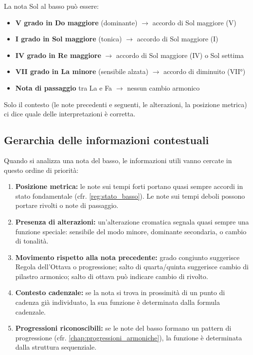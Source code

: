 \begin{esempio}
	\label{ex:ambiguita_sol}
	La nota Sol al basso può essere:
	\begin{itemize}
		\item \textbf{V grado in Do maggiore} (dominante) $\rightarrow$ accordo di Sol maggiore (V)
		\item \textbf{I grado in Sol maggiore} (tonica) $\rightarrow$ accordo di Sol maggiore (I)
		\item \textbf{IV grado in Re maggiore} $\rightarrow$ accordo di Sol maggiore (IV) o Sol settima
		\item \textbf{VII grado in La minore} (sensibile alzata) $\rightarrow$ accordo di \Soldiesis  diminuito (VII°)
		\item \textbf{Nota di passaggio} tra La e Fa $\rightarrow$ nessun cambio armonico
	\end{itemize}
	Solo il contesto (le note precedenti e seguenti, le alterazioni, la posizione metrica) ci dice quale delle interpretazioni è corretta.
\end{esempio}

\subsection{Gerarchia delle informazioni contestuali}

Quando si analizza una nota del basso, le informazioni utili vanno cercate in questo ordine di priorità:

\begin{regola}
	\label{reg:gerarchia_informazioni}
	\begin{enumerate}
		\item \textbf{Posizione metrica:} le note sui tempi forti portano quasi sempre accordi in stato fondamentale (cfr. \ref{reg:stato_basso}). Le note sui tempi deboli possono portare rivolti o note di passaggio.
		\item \textbf{Presenza di alterazioni:} un'alterazione cromatica segnala quasi sempre una funzione speciale: sensibile del modo minore, dominante secondaria, o cambio di tonalità.
		\item \textbf{Movimento rispetto alla nota precedente:} grado congiunto suggerisce Regola dell'Ottava o progressione; salto di quarta/quinta suggerisce cambio di pilastro armonico; salto di ottava può indicare cambio di rivolto.
		\item \textbf{Contesto cadenzale:} se la nota si trova in prossimità di un punto di cadenza già individuato, la sua funzione è determinata dalla formula cadenzale.
		\item \textbf{Progressioni riconoscibili:} se le note del basso formano un pattern di progressione (cfr. \ref{chap:progressioni_armoniche}), la funzione è determinata dalla struttura sequenziale.
	\end{enumerate}
\end{regola}

